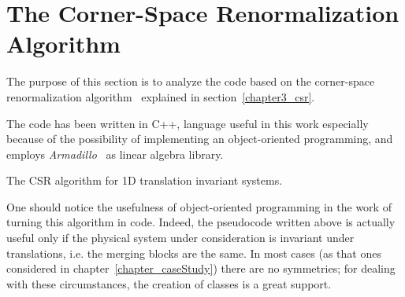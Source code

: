 \chapter{The Corner-Space Renormalization Algorithm} %
\label{AppendixA}

The purpose of this section is to analyze the code based on the corner-space renormalization algorithm~\cite{PhysRevLett.115.080604} explained in section~\ref{chapter3_csr}.

The code has been written in C++, language useful in this work especially because of the possibility of implementing an object-oriented programming, and employs \emph{Armadillo}~\cite{arma:book, arma:art} as linear algebra library. 
\medskip

\begin{algorithm}[H]
\label{algo_trans_inv}
\SetAlgoLined
\DontPrintSemicolon
{}
\bigskip
{}

\caption{The CSR algorithm for 1D translation invariant systems.}
\label{pseudocode}
\end{algorithm}

\pagebreak
One should notice the usefulness of object-oriented programming in the work of turning this algorithm in code. Indeed, the pseudocode written above is actually useful only if the physical system under consideration is invariant under translations, i.e. the merging blocks are the same. In most cases (as that ones considered in chapter~\ref{chapter_caseStudy}) there are no symmetries; for dealing with these circumstances, the creation of classes is a great support.

